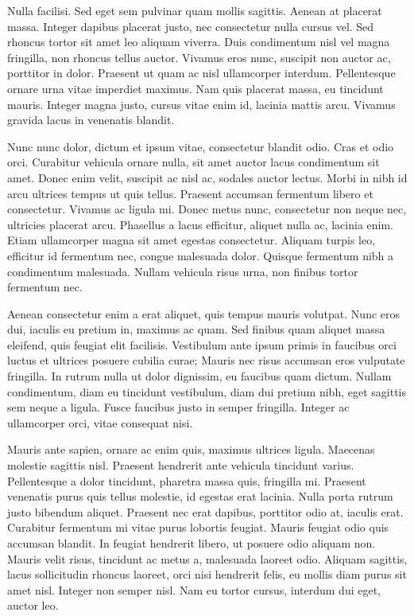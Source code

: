 \documentclass[onecolumn]{tome}
\begin{document}
Nulla facilisi. Sed eget sem pulvinar quam mollis sagittis. Aenean at placerat massa. Integer dapibus placerat justo, nec consectetur nulla cursus vel. Sed rhoncus tortor sit amet leo aliquam viverra. Duis condimentum nisl vel magna fringilla, non rhoncus tellus auctor. Vivamus eros nunc, suscipit non auctor ac, porttitor in dolor. Praesent ut quam ac nisl ullamcorper interdum. Pellentesque ornare urna vitae imperdiet maximus. Nam quis placerat massa, eu tincidunt mauris. Integer magna justo, cursus vitae enim id, lacinia mattis arcu. Vivamus gravida lacus in venenatis blandit.

Nunc nunc dolor, dictum et ipsum vitae, consectetur blandit odio. Cras et odio orci. Curabitur vehicula ornare nulla, sit amet auctor lacus condimentum sit amet. Donec enim velit, suscipit ac nisl ac, sodales auctor lectus. Morbi in nibh id arcu ultrices tempus ut quis tellus. Praesent accumsan fermentum libero et consectetur. Vivamus ac ligula mi. Donec metus nunc, consectetur non neque nec, ultricies placerat arcu. Phasellus a lacus efficitur, aliquet nulla ac, lacinia enim. Etiam ullamcorper magna sit amet egestas consectetur. Aliquam turpis leo, efficitur id fermentum nec, congue malesuada dolor. Quisque fermentum nibh a condimentum malesuada. Nullam vehicula risus urna, non finibus tortor fermentum nec.

Aenean consectetur enim a erat aliquet, quis tempus mauris volutpat. Nunc eros dui, iaculis eu pretium in, maximus ac quam. Sed finibus quam aliquet massa eleifend, quis feugiat elit facilisis. Vestibulum ante ipsum primis in faucibus orci luctus et ultrices posuere cubilia curae; Mauris nec risus accumsan eros vulputate fringilla. In rutrum nulla ut dolor dignissim, eu faucibus quam dictum. Nullam condimentum, diam eu tincidunt vestibulum, diam dui pretium nibh, eget sagittis sem neque a ligula. Fusce faucibus justo in semper fringilla. Integer ac ullamcorper orci, vitae consequat nisi.

Mauris ante sapien, ornare ac enim quis, maximus ultrices ligula. Maecenas molestie sagittis nisl. Praesent hendrerit ante vehicula tincidunt varius. Pellentesque a dolor tincidunt, pharetra massa quis, fringilla mi. Praesent venenatis purus quis tellus molestie, id egestas erat lacinia. Nulla porta rutrum justo bibendum aliquet. Praesent nec erat dapibus, porttitor odio at, iaculis erat. Curabitur fermentum mi vitae purus lobortis feugiat. Mauris feugiat odio quis accumsan blandit. In feugiat hendrerit libero, ut posuere odio aliquam non. Mauris velit risus, tincidunt ac metus a, malesuada laoreet odio. Aliquam sagittis, lacus sollicitudin rhoncus laoreet, orci nisi hendrerit felis, eu mollis diam purus sit amet nisl. Integer non semper nisl. Nam eu tortor cursus, interdum dui eget, auctor leo.
\end{document}
